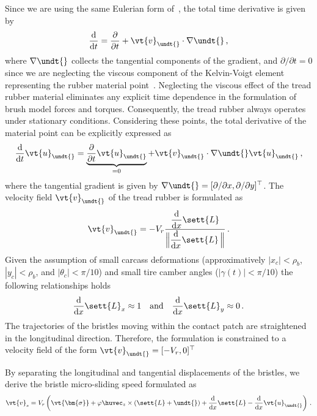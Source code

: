 Since we are using the same Eulerian form of~\cite{romano2022analytical}, the total time derivative is given by
%
\begin{equation*}
  \dfrac{\mathrm{d}}{\mathrm{d}t} =  \dfrac{\partial}{\partial t} + \vt{v}_{\undt{}} \cdot\nabla{\undt{}} \, \text{,}
\end{equation*}
%
where $\nabla{\undt{}}$ collects the tangential components of the gradient, and $\partial/\partial t = 0$ since we are neglecting the viscous component of the Kelvin-Voigt element representing the rubber material point~\cite{meyers2008mechanical}. Neglecting the viscous effect of the tread rubber material eliminates any explicit time dependence in the formulation of brush model forces and torques. Consequently, the tread rubber always operates under stationary conditions. Considering these points, the total derivative of the material point can be explicitly expressed as
%
\begin{equation*}
  \dfrac{\mathrm{d}}{\mathrm{d}t}\vt{u}_{\undt{}} = \underbrace{\dfrac{\partial}{\partial t}\vt{u}_{\undt{}}}_{=0} + \vt{v}_{\undt{}}\cdot\nabla{\undt{}}\vt{u}_{\undt{}} \, \text{,}
\end{equation*}
%
where the tangential gradient is given by $\nabla{\undt{}} = [\partial/\partial x, \partial/\partial y]^\top$. The velocity field $\vt{v}_{\undt{}}$ of the tread rubber is formulated as
%
\begin{equation*}
  \vt{v}_{\undt{}} = -V_r \dfrac{\dfrac{\mathrm{d}}{\mathrm{d}x} \sett{L}}{\Big\|\dfrac{\mathrm{d}}{\mathrm{d}x} \sett{L}\,\Big\|} \, \text{.}
\end{equation*}
%
Given the assumption of small carcass deformations (approximatively $|x_c| < \rho_b$, $|y_c| < \rho_b$, and $|\theta_c| < \pi/10$) and small tire camber angles ($|\gamma(t)| < \pi/10$) the following relationships holds~\cite{romano2022advanced}
%
\begin{equation*}
  \dfrac{\mathrm{d}}{\mathrm{d}x} \sett{L}_x \approx 1 \quad \text{and} \quad \dfrac{\mathrm{d}}{\mathrm{d}x} \sett{L}_y \approx 0 \, \text{.}
\end{equation*}
%
The trajectories of the bristles moving within the contact patch are straightened in the longitudinal direction. Therefore, the formulation is constrained to a velocity field of the form $\vt{v}_{\undt{}} = [-V_r, 0]^\top$

By separating the longitudinal and tangential displacements of the bristles, we derive the bristle micro-sliding speed formulated as
%
\begin{equation}
  \vt{v}_s = V_r\left( \vt{\bm{\sigma}} + \varphi\huvec_z \times \left(\sett{L} + \undt{}\right) + \dfrac{\mathrm{d}}{\mathrm{d}x}\sett{L} - \dfrac{\mathrm{d}}{\mathrm{d}x}\vt{u}_{\undt{}} \right) \, \text{.}
  \label{app3:eq:v_s_int}
\end{equation}

